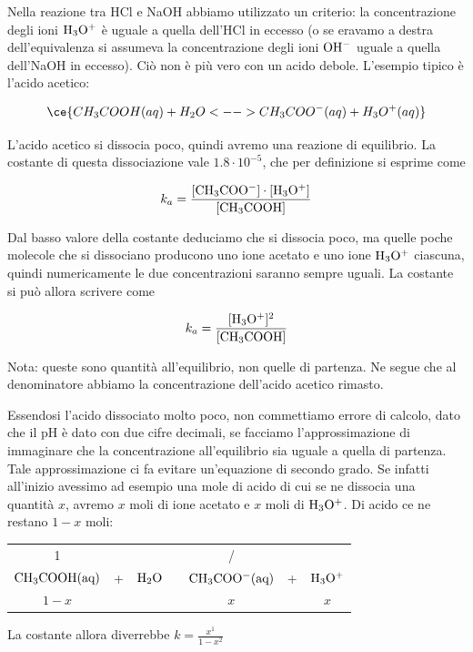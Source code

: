 Nella reazione tra HCl e NaOH abbiamo utilizzato un criterio: la concentrazione degli ioni $\rm H_3O^+$ è uguale a quella dell'HCl in eccesso (o se eravamo a destra dell'equivalenza si assumeva la concentrazione degli ioni $\rm OH^-$ uguale a quella dell'NaOH in eccesso). Ciò non è più vero con un acido debole. L'esempio tipico è l'acido acetico:

$$\ce{CH_3COOH(aq) + H_2O <--> CH_3COO^-(aq) + H_3O^+(aq)}$$

L'acido acetico si dissocia poco, quindi avremo una reazione di equilibrio. La costante di questa dissociazione vale $1.8 \cdot 10^{-5}$, che per definizione si esprime come

$$k_a=\frac{\rm{[CH_3COO^-]} \cdot \rm{[H_3O^+]}}{\rm{[CH_3COOH]}}$$

Dal basso valore della costante deduciamo che si dissocia poco, ma quelle poche molecole che si dissociano producono uno ione acetato e uno ione $\rm H_3O^+$ ciascuna, quindi numericamente le due concentrazioni saranno sempre uguali. La costante si può allora scrivere come

$$k_a=\frac{\rm{[H_3O^+]^2}}{\rm{[CH_3COOH]}}$$

Nota: queste sono quantità all'equilibrio, non quelle di partenza. Ne segue che al denominatore abbiamo la concentrazione dell'acido acetico rimasto.

Essendosi l'acido dissociato molto poco, non commettiamo errore di calcolo, dato che il pH è dato con due cifre decimali, se facciamo l'approssimazione di immaginare che la concentrazione all'equilibrio sia uguale a quella di partenza. Tale approssimazione ci fa evitare un'equazione di secondo grado. Se infatti all'inizio avessimo ad esempio una mole di acido di cui se ne dissocia una quantità $x$, avremo $x$ moli di ione acetato e $x$ moli di $\rm H_3O^+$. Di acido ce ne restano $1-x$ moli:

\begin{center}
    \begin{tabular}{ccccccc}
        1 &  &  & & / & &\\
        $\rm CH_3COOH(aq)$ & + & $\rm H_2O$ & \ce{<-->} & $\rm CH_3COO^-(aq)$ & + & $\rm H_3O^+$\\
        $1-x$ & & & & $x$ & & $x$\\
    \end{tabular}
\end{center}

La costante allora diverrebbe $k=\frac{x^1}{1-x^2}$

